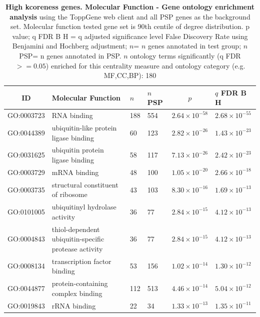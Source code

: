   \begin{table}[ht]
\centering
\begin{adjustbox}{width=\textwidth}
\setlength{\extrarowheight}{2pt}
\begin{tabular}{@{}clllcl@{}}
  \toprule
  ID & Molecular Function & $n$ & $n$ PSP & $p$ & $q$ FDR B H \\ 

  \midrule
GO:0003723 & RNA binding & 188 & 554 & $2.64 \times 10^{-58}$ & $2.68 \times 10^{-55}$ \\ 
  GO:0044389 & ubiquitin-like protein ligase binding & 60 & 123 & $2.82 \times 10^{-26}$ & $1.43 \times 10^{-23}$ \\ 
  GO:0031625 & ubiquitin protein ligase binding & 58 & 117 & $7.13 \times 10^{-26}$ & $2.42 \times 10^{-23}$ \\ 
  GO:0003729 & mRNA binding & 48 & 100 & $1.05 \times 10^{-20}$ & $2.66 \times 10^{-18}$ \\ 
  GO:0003735 & structural constituent of ribosome & 43 & 103 & $8.30 \times 10^{-16}$ & $1.69 \times 10^{-13}$ \\ 
  GO:0101005 & ubiquitinyl hydrolase activity & 36 & 77 & $2.84 \times 10^{-15}$ & $4.12 \times 10^{-13}$ \\ 
  GO:0004843 & thiol-dependent ubiquitin-specific protease activity & 36 & 77 & $2.84 \times 10^{-15}$ & $4.12 \times 10^{-13}$ \\ 
  GO:0008134 & transcription factor binding & 53 & 156 & $1.02 \times 10^{-14}$ & $1.30 \times 10^{-12}$ \\ 
  GO:0044877 & protein-containing complex binding & 112 & 513 & $4.46 \times 10^{-14}$ & $5.04 \times 10^{-12}$ \\ 
  GO:0019843 & rRNA binding & 22 & 34 & $1.33 \times 10^{-13}$ & $1.35 \times 10^{-11}$ \\ 
   \bottomrule
\end{tabular}
\end{adjustbox}
\caption[Gene ontology enrichment High kcoreness genes Molecular Function of genes above 90th centile of distribution]{\textbf{High kcoreness genes. Molecular Function - Gene ontology enrichment analysis} using the ToppGene web client and all PSP genes as the background set.  Molecular function tested gene set is 90th centile of degree distribution.  p value; q FDR B H = q adjusted significance level False Discovery Rate using Benjamini and Hochberg adjustment; $n$= $n$ genes annotated in test group; $n$ PSP= n genes annotated in PSP. $n$ ontology terms significantly (q FDR$>=0.05$) enriched for this centrality measure and ontology category (e.g. MF,CC,BP): 180} 
\label{tab:ToppGENE GO: Molecular Function. kco 90 centile cwpsp.txtp = p value; q FDR B H = q adjusted significance level False Discovery Rate using Benjamini and Hochberg adjustment; n= n genes annotated in test group; n PSP= n genes annotated in PSP. n significant in category 180}
\end{table}

